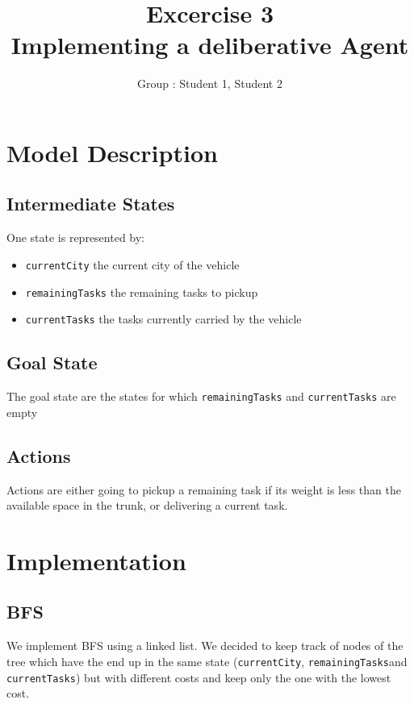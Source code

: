 \documentclass[11pt]{article}
\title{\bf Excercise 3\\ Implementing a deliberative Agent}
\author{Group \textnumero : Student 1, Student 2}
\begin{document}
\maketitle

\section{Model Description}

\subsection{Intermediate States}
One state is represented by: 
\begin{itemize}
\item \verb|currentCity| the current city of the vehicle
\item \verb|remainingTasks| the remaining tasks to pickup
\item \verb|currentTasks| the tasks currently carried by the vehicle 
\end{itemize}

\subsection{Goal State}
The goal state are the states for which  \verb|remainingTasks| and \verb|currentTasks| are empty

\subsection{Actions}
Actions are either going to pickup a remaining task if its weight is less than the available space in the trunk, or delivering a current task.

\section{Implementation}

\subsection{BFS}
We implement BFS using a linked list. We decided to keep track of nodes of the tree which have the end up in the same state (\verb|currentCity|, \verb|remainingTasks|and \verb|currentTasks|) but with different costs and keep only the one with the lowest cost.
\end{document}
